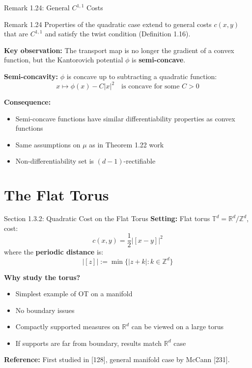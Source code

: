 \documentclass[aspectratio=169]{beamer}
\newcommand{\R}{\mathbb{R}}
\newcommand{\Z}{\mathbb{Z}}
\newcommand{\Td}{\mathbb{T}^d}
\begin{document}
\begin{frame}{Remark 1.24: General $C^{1,1}$ Costs}
\begin{block}{Remark 1.24}
Properties of the quadratic case extend to general costs $c(x,y)$ that are $C^{1,1}$ and satisfy the twist condition (Definition 1.16).
\end{block}

\vspace{0.3cm}
\textbf{Key observation:} The transport map is no longer the gradient of a convex function, but the Kantorovich potential $\phi$ is \textbf{semi-concave}.

\vspace{0.3cm}
\textbf{Semi-concavity:} $\phi$ is concave up to subtracting a quadratic function:
\[
x \mapsto \phi(x) - C|x|^2 \quad \text{is concave for some } C > 0
\]

\vspace{0.3cm}
\textbf{Consequence:}
\begin{itemize}
    \item Semi-concave functions have similar differentiability properties as convex functions
    \item Same assumptions on $\mu$ as in Theorem 1.22 work
    \item Non-differentiability set is $(d-1)$-rectifiable
\end{itemize}
\end{frame}

\section{The Flat Torus}

\begin{frame}{Section 1.3.2: Quadratic Cost on the Flat Torus}
\textbf{Setting:} Flat torus $\Td = \R^d / \Z^d$, cost:
\[
c(x,y) = \frac{1}{2}|[x-y]|^2
\]
where the \textbf{periodic distance} is:
\[
\boxed{|[z]| := \min\{|z + k| : k \in \Z^d\}}
\]

\vspace{0.3cm}
\textbf{Why study the torus?}
\begin{itemize}
    \item Simplest example of OT on a manifold
    \item No boundary issues
    \item Compactly supported measures on $\R^d$ can be viewed on a large torus
    \item If supports are far from boundary, results match $\R^d$ case
\end{itemize}

\vspace{0.2cm}
\textbf{Reference:} First studied in [128], general manifold case by McCann [231].
\end{frame}
\end{document}
